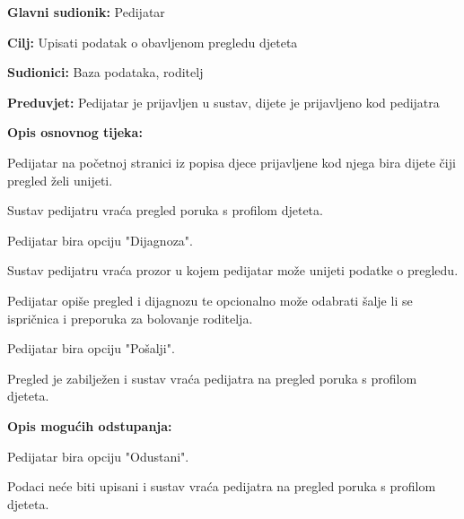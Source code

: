 					\noindent {}
					\begin{packed_item}
						
						\item \textbf{Glavni sudionik: }Pedijatar
						\item  \textbf{Cilj:} Upisati podatak o obavljenom pregledu djeteta
						\item  \textbf{Sudionici:} Baza podataka, roditelj
						\item  \textbf{Preduvjet:} Pedijatar je prijavljen u sustav, dijete je prijavljeno kod pedijatra
						\item  \textbf{Opis osnovnog tijeka:}
						
						\item[] \begin{packed_enum}
							
							\item Pedijatar na početnoj stranici iz popisa djece prijavljene kod njega bira dijete čiji pregled želi unijeti.
							\item Sustav pedijatru vraća pregled poruka s profilom djeteta.
							\item Pedijatar bira opciju "Dijagnoza".
							\item Sustav pedijatru vraća prozor u kojem pedijatar može unijeti podatke o pregledu.
							\item Pedijatar opiše pregled i dijagnozu te opcionalno može odabrati šalje li se ispričnica i preporuka za bolovanje roditelja.
							\item Pedijatar bira opciju "Pošalji".
							\item Pregled je zabilježen i sustav vraća pedijatra na pregled poruka s profilom djeteta.
						\end{packed_enum}
						
						\item  \textbf{Opis mogućih odstupanja:}
						
						\item[] \begin{packed_item}
							
							\item[6.a] Pedijatar bira opciju "Odustani".
							\item[] \begin{packed_enum}
								
								\item Podaci neće biti upisani i sustav vraća pedijatra na pregled poruka s profilom djeteta.
							\end{packed_enum}
							
							
						\end{packed_item}
						
						
					\end{packed_item}
					
